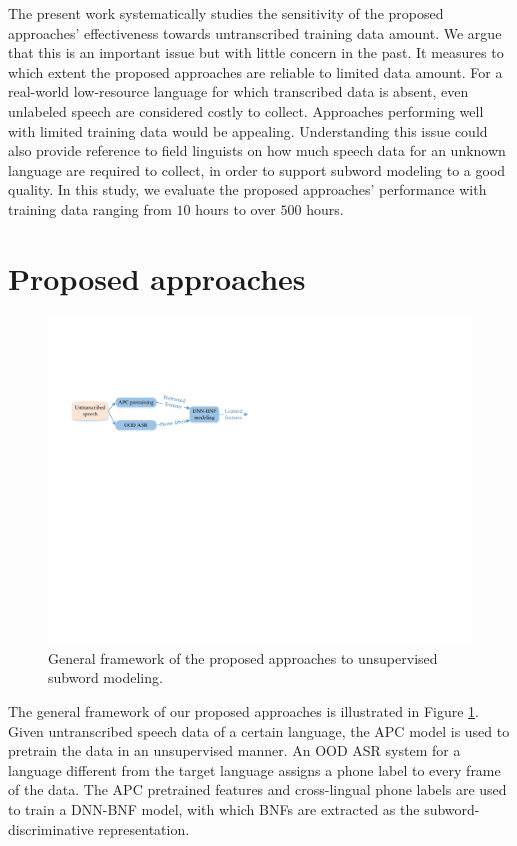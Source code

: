 \documentclass[a4paper]{article}
\begin{document}
The present work systematically studies the  sensitivity of the proposed approaches' effectiveness towards    untranscribed training data amount.  We argue that this is an important issue but with little concern in the past. 
It measures to which extent the proposed approaches are reliable to limited data amount. For a real-world low-resource language for which transcribed data is absent, 
even unlabeled speech are considered costly to collect. Approaches performing well with limited training data  would be appealing. 
Understanding this issue  could also provide reference to field linguists on how much speech data for an unknown language  are required to collect, in order to support subword modeling to a good quality. 
In this study, we evaluate the proposed approaches' performance with    training data ranging from $10$ hours to over $500$ hours.


\section{Proposed approaches}

\begin{figure}
    \centering
    \includegraphics[width=0.95\linewidth]{LaTeX/apc_framework.pdf}
    \caption{General framework of the proposed approaches to unsupervised subword modeling.  }
    \label{fig:general_framework}
\end{figure}
The general framework of our proposed approaches is illustrated in Figure \ref{fig:general_framework}. Given untranscribed speech data of a certain  language, the APC  model is used to pretrain the data in an unsupervised manner. An OOD ASR system for a language different from the target language  assigns a phone label to every frame of the data. The APC pretrained features and  cross-lingual phone labels are used to train a DNN-BNF model, with which BNFs are extracted as the subword-discriminative representation.
\end{document}
